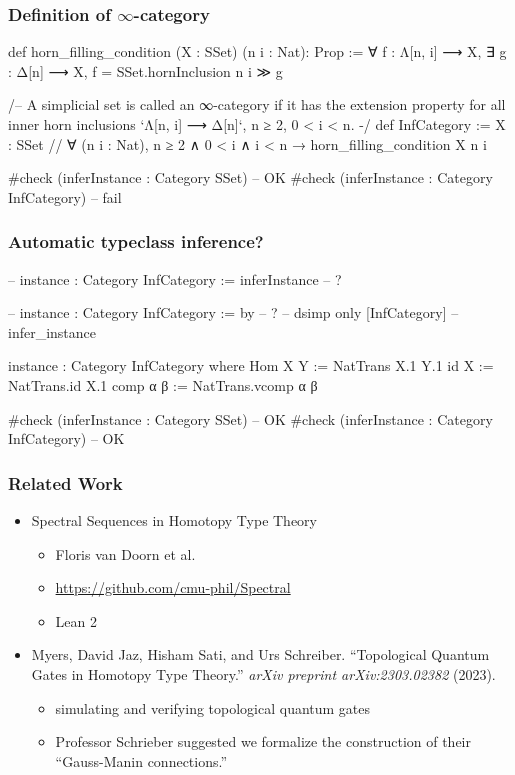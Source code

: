\documentclass{beamer}
\begin{document}

\begin{frame}[fragile] %
\frametitle{Definition of $\infty$-category}
  \begin{leancode}
  def horn_filling_condition (X : SSet) (n i : Nat): Prop :=
    ∀ f : Λ[n, i] ⟶ X, ∃ g : Δ[n] ⟶ X,
    f = SSet.hornInclusion n i ≫ g
  
  /-- A simplicial set is called an ∞-category
  if it has the extension property for all inner horn inclusions
  `Λ[n, i] ⟶ Δ[n]`, n ≥ 2, 0 < i < n. -/
  def InfCategory := {X : SSet //
    ∀ (n i : Nat),
    n ≥ 2 ∧ 0 < i ∧ i < n → horn_filling_condition X n i}
    
  #check (inferInstance : Category SSet) -- OK
  #check (inferInstance : Category InfCategory) -- fail
  \end{leancode}
\end{frame}

\begin{frame}[fragile] %
\frametitle{Automatic typeclass inference?}
  \begin{leancode}
  -- instance : Category InfCategory := inferInstance -- ?
  
  -- instance : Category InfCategory := by -- ?
  --   dsimp only [InfCategory]
  --   infer_instance
  
  instance : Category InfCategory where
    Hom X Y := NatTrans X.1 Y.1
    id X := NatTrans.id X.1
    comp α β := NatTrans.vcomp α β

  #check (inferInstance : Category SSet) -- OK
  #check (inferInstance : Category InfCategory) -- OK
  \end{leancode}
\end{frame}


\begin{frame}
   \frametitle{Related Work}
   
   \begin{itemize}
   \item Spectral Sequences in Homotopy Type Theory
   	   \begin{itemize}
	   \item Floris van Doorn et al.
	   \item \url{https://github.com/cmu-phil/Spectral}
	   \item Lean 2
	   \end{itemize}
	\item Myers, David Jaz, Hisham Sati, and Urs Schreiber. ``Topological Quantum Gates in Homotopy Type Theory.'' \textit{arXiv preprint arXiv:2303.02382} (2023).
   	   \begin{itemize}
	   \item simulating and verifying topological quantum gates
	   \item Professor Schrieber suggested we formalize the construction of their ``Gauss-Manin connections.''
	   \end{itemize}
   \end{itemize}
\end{frame}



\end{document}

